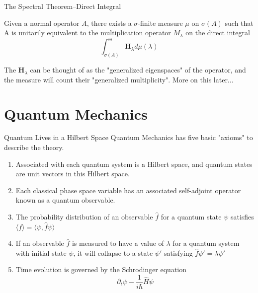 \documentclass{beamer}
\begin{document}
\begin{frame}{The Spectral Theorem--Direct Integral}
    \begin{theorem}
        Given a normal operator $A$, there exists a $\sigma$-finite measure $\mu$
        on $\sigma(A)$ such that A is unitarily equivalent to the multiplication
        operator $M_{\lambda}$ on the direct integral
        \[
            \int_{\sigma(A)}^{\oplus} \textbf{H}_{\lambda} d\mu(\lambda)
        \]
    \end{theorem}

    The $\textbf{H}_{\lambda}$ can be thought of as the "generalized
    eigenspaces" of the operator, and the measure will count their "generalized
    multiplicity". More on this later...
\end{frame}

\section{Quantum Mechanics}
\begin{frame}{Quantum Lives in a Hilbert Space}
Quantum Mechanics has five basic "axioms" to describe the theory.

    \begin{enumerate}
        \item Associated with each quantum system is a Hilbert space, and
            quantum states are unit vectors in this Hilbert space.
        \item Each classical phase space variable has an associated self-adjoint
            operator known as a quantum observable.
        \item The probability distribution of an observable $\hat{f}$ for a
            quantum state $\psi$ satisfies $\langle f \rangle =
            \langle \psi, \hat{f} \psi \rangle$
        \item If an observable $\hat{f}$ is measured to have a value of
            $\lambda$ for a quantum system with initial state $\psi$, it will
            collapse to a state $\psi '$ satisfying $\hat{f}\psi' = \lambda
            \psi'$
        \item Time evolution is governed by the Schrodinger equation
            \[
                \partial_t \psi - \frac{1}{i\hbar}\hat{H}\psi
            \]
    \end{enumerate}
\end{frame}
\end{document}
